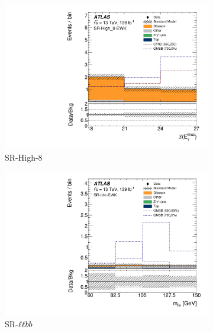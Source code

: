 \begin{figure}[tp]
\centering
\begin{subfigure}{0.48\textwidth}
\centering
\includegraphics[width=\textwidth]{figures/2ljets_sr_high_8_met_sig.pdf}
\caption{SR-High-8}
\end{subfigure}
\hfill
\begin{subfigure}{0.48\textwidth}
\centering
\includegraphics[width=\textwidth]{figures/2ljets_sr_llbb_mbb.pdf}
\caption{SR-$\ell\ell bb$}
\end{subfigure}
\\[0.5em]
\begin{subfigure}{0.48\textwidth}
\centering

\end{subfigure}
\end{figure}
